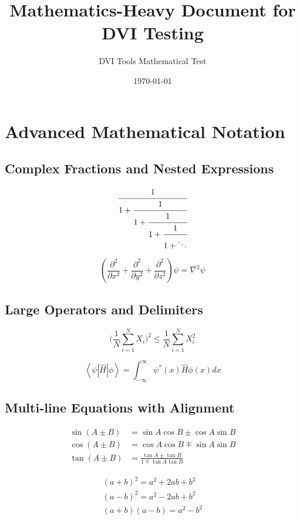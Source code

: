 \documentclass[11pt]{article}
\title{Mathematics-Heavy Document for DVI Testing}
\author{DVI Tools Mathematical Test}
\date{\today}
\begin{document}
\maketitle

\section{Advanced Mathematical Notation}

\subsection{Complex Fractions and Nested Expressions}

\begin{equation}
\cfrac{1}{1+\cfrac{1}{1+\cfrac{1}{1+\cfrac{1}{1+\ddots}}}}
\end{equation}

\begin{equation}
\left(\frac{\partial^2}{\partial x^2} + \frac{\partial^2}{\partial y^2} + \frac{\partial^2}{\partial z^2}\right)\psi = \nabla^2\psi
\end{equation}

\subsection{Large Operators and Delimiters}

\begin{equation}
\biggl(\frac{1}{N}\sum_{i=1}^{N} X_i\biggr)^2 \leq \frac{1}{N}\sum_{i=1}^{N} X_i^2
\end{equation}

\begin{equation}
\left\langle \psi \left| \hat{H} \right| \phi \right\rangle = \int_{-\infty}^{\infty} \psi^*(x) \hat{H} \phi(x) dx
\end{equation}

\subsection{Multi-line Equations with Alignment}

\begin{align}
\sin(A \pm B) &= \sin A \cos B \pm \cos A \sin B \\
\cos(A \pm B) &= \cos A \cos B \mp \sin A \sin B \\
\tan(A \pm B) &= \frac{\tan A \pm \tan B}{1 \mp \tan A \tan B}
\end{align}

\begin{gather}
(a + b)^2 = a^2 + 2ab + b^2 \\
(a - b)^2 = a^2 - 2ab + b^2 \\
(a + b)(a - b) = a^2 - b^2
\end{gather}
\end{document}
